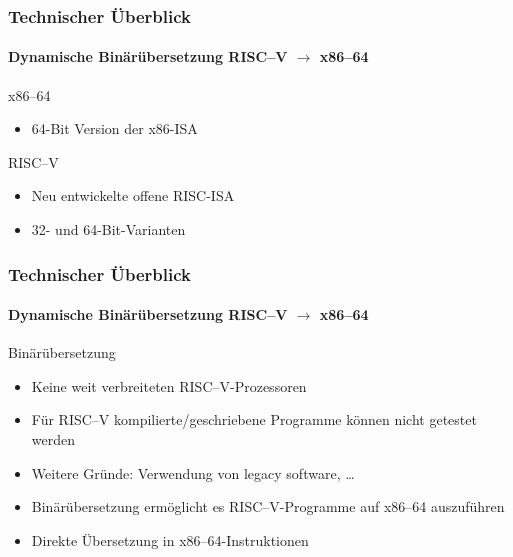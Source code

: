 \documentclass[aspectratio=169, sectionpage=false, german]{tumbeamer}
\newcommand{\refer}[0]{\ensuremath{\rightarrow} }
\begin{document}
\begin{frame}
	\frametitle{Technischer Überblick}

	\framesubtitle {Dynamische Binärübersetzung RISC--V \refer x86--64}

	\begin{block}{x86--64}
		\begin{itemize}
			\item 64-Bit Version der x86-ISA
		\end{itemize}
	\end{block}

	\vspace{1cm}

	\begin{block}{RISC--V}
		\begin{itemize}
			\item Neu entwickelte offene RISC-ISA
			\item 32- und 64-Bit-Varianten
		\end{itemize}
	\end{block}
\end{frame}
\begin{frame}
	\frametitle{Technischer Überblick}

	\framesubtitle {Dynamische Binärübersetzung RISC--V \refer x86--64}

	\begin{block}{Binärübersetzung}
		\begin{itemize}
			\item Keine weit verbreiteten RISC--V-Prozessoren
			\item Für RISC--V kompilierte/geschriebene Programme können nicht getestet werden
			\item Weitere Gründe: Verwendung von legacy software, \ldots
			\item Binärübersetzung ermöglicht es RISC--V-Programme auf x86--64 auszuführen
			\item Direkte Übersetzung in x86--64-Instruktionen
		\end{itemize}
	\end{block}
\end{frame}
\end{document}
